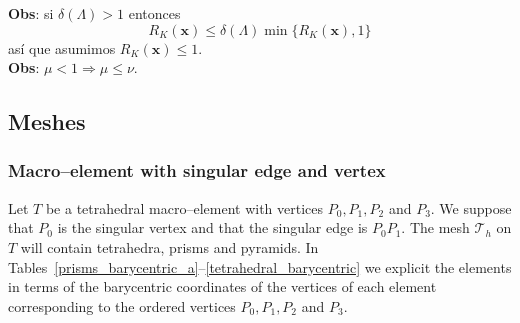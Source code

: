 \textbf{Obs}: si $\delta(\Lambda)>1$ entonces
\[
  R_K(\textbf{x}) \leqslant \delta(\Lambda)\min\{ R_K(\textbf{x}), 1\}
\]
as\'i que asumimos $R_K(\textbf{x})\leqslant 1$.\\[7pt]
\textbf{Obs}: $\mu < 1 \Rightarrow \mu \leqslant \nu$. \\[7pt]



\subsection{Meshes}\label{meshes}
\subsubsection{Macro--element with singular edge and vertex}\label{caso4}
Let $T$ be a tetrahedral macro--element with vertices $P_0, P_1, P_2$ and $P_3$. We suppose that $P_0$ is the singular vertex and that the
singular edge is $P_0P_1$. The mesh $\mathcal T_h$ on $T$ will contain tetrahedra, prisms and pyramids. 
In Tables~\ref{prisms_barycentric_a}--\ref{tetrahedral_barycentric}
we explicit the elements in terms
of the barycentric coordinates of the vertices of each element corresponding to the ordered vertices $P_0, P_1, P_2$ and $P_3$.
\bigskip

\prismsBaryCoordA

\prismsBaryCoordB

\pyramidsBaryCoord

\tetrahedraBaryCoord


